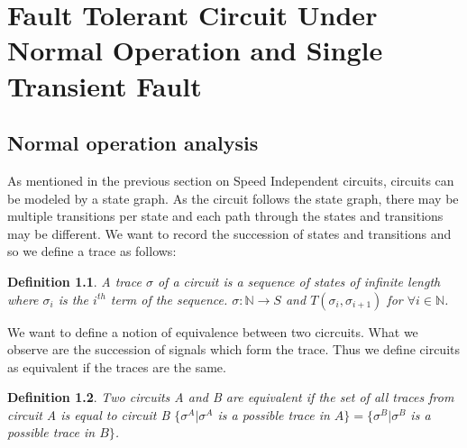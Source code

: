 \documentclass[12pt]{report}
\newtheorem*{definition}{Definition}
\begin{document}
\chapter{Fault Tolerant Circuit Under Normal Operation and Single Transient Fault}
\section{Normal operation analysis}
As mentioned in the previous section on Speed Independent circuits, circuits can be modeled by a state graph.  
As the circuit follows the state graph, there may be multiple transitions per state and each path through the states and transitions may be different.  We want to record the succession of states and transitions and so we define a trace as follows:
\begin{definition}A {\em trace} $\sigma$ of a circuit is a sequence of states of infinite length where $\sigma_i$ is the $i^{th}$ term of the sequence.  $\sigma: \mathbb{N} \to S$ and $T(\sigma_i,\sigma_{i+1})$ for $\forall i \in \mathbb{N}$.\end{definition} 

We want to define a notion of equivalence between two cicrcuits.  What we observe are the succession of signals which form the trace.  Thus we define circuits as equivalent if the traces are the same. 
\begin{definition} Two circuits A and B are {\em equivalent} if the set of all traces from circuit A is equal to circuit B $\{\sigma^A |\sigma^A$ is a possible trace in $A\}=\{\sigma^B |\sigma^B$ is a possible trace in $B\}$.
\end{definition}

\end{document}

